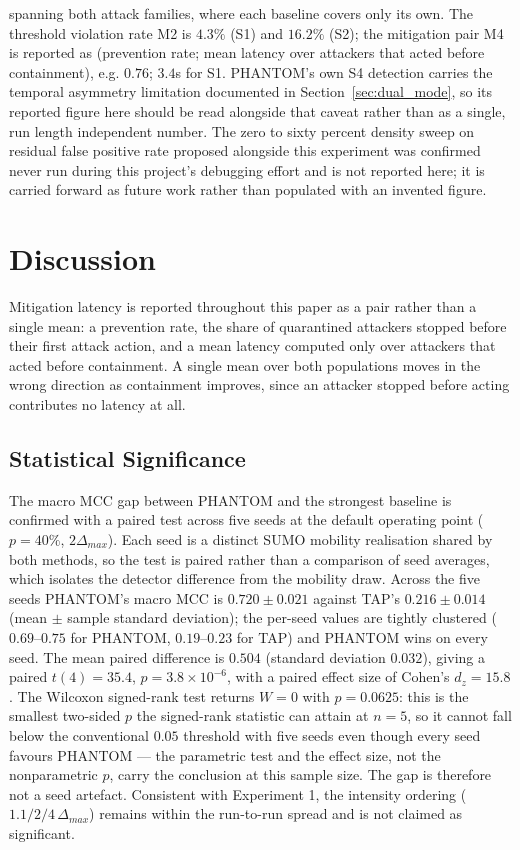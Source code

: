 \documentclass[final,5p,twocolumn]{elsarticle}
\theoremstyle{remark}
\theoremstyle{plain}
\begin{document}
spanning both attack families, where each baseline covers only its own.
The threshold violation rate M2 is $4.3\%$ (S1) and $16.2\%$ (S2); the
mitigation pair M4 is reported as (prevention rate; mean latency over
attackers that acted before containment), e.g. $0.76$; $3.4$s for S1.
PHANTOM's own S4 detection carries the temporal asymmetry limitation
documented in Section~\ref{sec:dual_mode}, so its reported figure here
should be read alongside that caveat rather than as a single, run length
independent number. The zero to sixty percent density sweep on residual
false positive rate proposed alongside this experiment was confirmed never
run during this project's debugging effort and is not reported here; it is
carried forward as future work rather than populated with an invented
figure.


\section{Discussion}
\label{sec:discussion}

Mitigation latency is reported throughout this paper as a pair rather than a
single mean: a prevention rate, the share of quarantined attackers stopped
before their first attack action, and a mean latency computed only over
attackers that acted before containment. A single mean over both
populations moves in the wrong direction as containment improves, since an
attacker stopped before acting contributes no latency at all.

\subsection{Statistical Significance}
The macro MCC gap between PHANTOM and the strongest baseline is confirmed with
a paired test across five seeds at the default operating point ($p{=}40\%$,
$2\Delta_{max}$). Each seed is a distinct SUMO mobility realisation shared by
both methods, so the test is paired rather than a comparison of seed averages,
which isolates the detector difference from the mobility draw. Across the five
seeds PHANTOM's macro MCC is $0.720 \pm 0.021$ against TAP's $0.216 \pm 0.014$
(mean $\pm$ sample standard deviation); the per-seed values are tightly
clustered ($0.69$--$0.75$ for PHANTOM, $0.19$--$0.23$ for TAP) and PHANTOM wins
on every seed. The mean paired difference is $0.504$ (standard deviation
$0.032$), giving a paired $t(4){=}35.4$, $p{=}3.8\times10^{-6}$, with a
paired effect size of Cohen's $d_z{=}15.8$. The Wilcoxon signed-rank test
returns $W{=}0$ with $p{=}0.0625$: this is the smallest two-sided $p$ the
signed-rank statistic can attain at $n{=}5$, so it cannot fall below the
conventional $0.05$ threshold with five seeds even though every seed favours
PHANTOM --- the parametric test and the effect size, not the nonparametric
$p$, carry the conclusion at this sample size. The gap is therefore not a seed
artefact. Consistent with Experiment 1, the intensity ordering
($1.1/2/4\,\Delta_{max}$) remains within the run-to-run spread and is not
claimed as significant.
\end{document}
